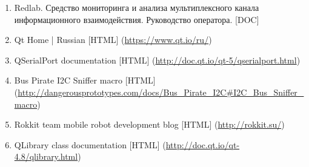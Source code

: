 \begin{enumerate}
 \item \label{sma_manual} Redlab. Средство мониторинга и анализа мультиплексного канала информационного взаимодействия. Руководство оператора. [DOC]
 \item \label{qt_home} Qt Home | Russian [HTML] (\url{https://www.qt.io/ru/})
 \item \label{qtserialport} QSerialPort documentation [HTML] (\url{http://doc.qt.io/qt-5/qserialport.html})
 \item \label{buspirate_i2c_snif} Bus Pirate I2C Sniffer macro [HTML] (\url{http://dangerousprototypes.com/docs/Bus_Pirate_I2C#I2C_Bus_Sniffer_macro})
 \item \label{rokkit_bot} Rokkit team mobile robot development blog [HTML] (\url{http://rokkit.su/})
 \item \label{qlibrary} QLibrary class documentation [HTML] (\url{http://doc.qt.io/qt-4.8/qlibrary.html})
\end{enumerate}
